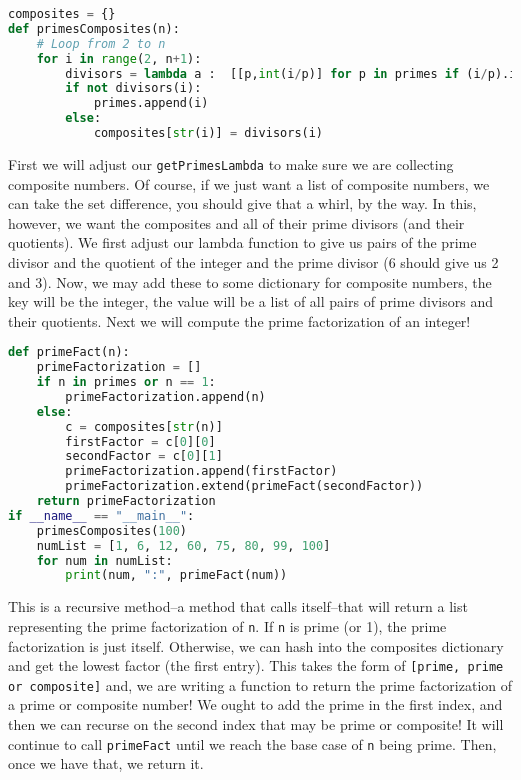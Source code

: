 \documentclass[12pt]{article}
\begin{document}
\begin{lstlisting}[language=Python]
composites = {}
def primesComposites(n):
    # Loop from 2 to n
    for i in range(2, n+1):
        divisors = lambda a :  [[p,int(i/p)] for p in primes if (i/p).is_integer()]
        if not divisors(i):
            primes.append(i)
        else:
            composites[str(i)] = divisors(i)
\end{lstlisting}
First we will adjust our \texttt{getPrimesLambda} to make sure we are collecting composite numbers. Of course, if we just want a list of composite numbers, we can take the set difference, you should give that a whirl, by the way. In this, however, we want the composites and all of their prime divisors (and their quotients). We first adjust our lambda function to give us pairs of the prime divisor and the quotient of the integer and the prime divisor (6 should give us 2 and 3). Now, we may add these to some dictionary for composite numbers, the key will be the integer, the value will be a list of all pairs of prime divisors and their quotients. Next we will compute the prime factorization of an integer!\\
\begin{lstlisting}[language=Python]
def primeFact(n):
    primeFactorization = []
    if n in primes or n == 1:
        primeFactorization.append(n)
    else:
        c = composites[str(n)]
        firstFactor = c[0][0]
        secondFactor = c[0][1]
        primeFactorization.append(firstFactor)
        primeFactorization.extend(primeFact(secondFactor))
    return primeFactorization
if __name__ == "__main__":
    primesComposites(100)
    numList = [1, 6, 12, 60, 75, 80, 99, 100]
    for num in numList:
        print(num, ":", primeFact(num))
\end{lstlisting}
This is a recursive method--a method that calls itself--that will return a list representing the prime factorization of \texttt{n}. If \texttt{n} is prime (or 1), the prime factorization is just itself. Otherwise, we can hash into the composites dictionary and get the lowest factor (the first entry). This takes the form of \texttt{[prime, prime or composite]} and, we are writing a function to return the prime factorization of a prime or composite number! We ought to add the prime in the first index, and then we can recurse on the second index that may be prime or composite! It will continue to call \texttt{primeFact} until we reach the base case of \texttt{n} being prime. Then, once we have that, we return it.\\
\end{document}
